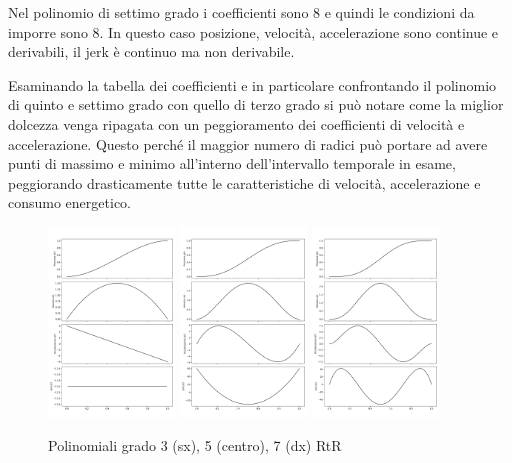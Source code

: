 Nel polinomio di settimo grado i coefficienti sono 8 e quindi le condizioni da imporre sono 8.
In questo caso posizione, velocità, accelerazione sono continue e derivabili, il jerk è continuo ma non derivabile.

Esaminando la tabella dei coefficienti e in particolare confrontando il polinomio di quinto e settimo grado con quello di terzo grado si può notare come la miglior dolcezza venga ripagata con un peggioramento dei coefficienti di velocità e accelerazione.
Questo perché il maggior numero di radici può portare ad avere punti di massimo e minimo all'interno dell'intervallo temporale in esame, peggiorando drasticamente tutte le caratteristiche di velocità, accelerazione e consumo energetico.

\begin{figure}[h]
    \centering
    \includegraphics[width=0.3\textwidth]{Immagini/polinom_terzo_grado.png}
    \includegraphics[width=0.3\textwidth]{Immagini/polinom_quinto_grado.png}
    \includegraphics[width=0.3\textwidth]{Immagini/polinom_settimo_grado.png}
    \caption{Polinomiali grado 3 (sx), 5 (centro), 7 (dx) RtR}
\end{figure}


